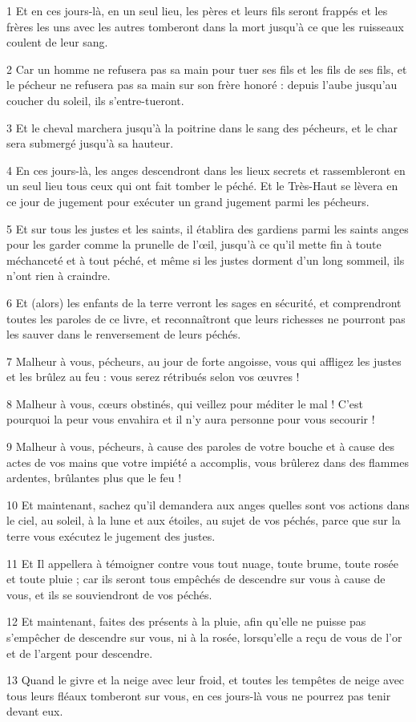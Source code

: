 \par 1 Et en ces jours-là, en un seul lieu, les pères et leurs fils seront frappés et les frères les uns avec les autres tomberont dans la mort jusqu'à ce que les ruisseaux coulent de leur sang.
\par 2 Car un homme ne refusera pas sa main pour tuer ses fils et les fils de ses fils, et le pécheur ne refusera pas sa main sur son frère honoré : depuis l'aube jusqu'au coucher du soleil, ils s'entre-tueront.
\par 3 Et le cheval marchera jusqu'à la poitrine dans le sang des pécheurs, et le char sera submergé jusqu'à sa hauteur.
\par 4 En ces jours-là, les anges descendront dans les lieux secrets et rassembleront en un seul lieu tous ceux qui ont fait tomber le péché. Et le Très-Haut se lèvera en ce jour de jugement pour exécuter un grand jugement parmi les pécheurs.
\par 5 Et sur tous les justes et les saints, il établira des gardiens parmi les saints anges pour les garder comme la prunelle de l'œil, jusqu'à ce qu'il mette fin à toute méchanceté et à tout péché, et même si les justes dorment d'un long sommeil, ils n'ont rien à craindre.
\par 6 Et (alors) les enfants de la terre verront les sages en sécurité, et comprendront toutes les paroles de ce livre, et reconnaîtront que leurs richesses ne pourront pas les sauver dans le renversement de leurs péchés.
\par 7 Malheur à vous, pécheurs, au jour de forte angoisse, vous qui affligez les justes et les brûlez au feu : vous serez rétribués selon vos œuvres !
\par 8 Malheur à vous, cœurs obstinés, qui veillez pour méditer le mal ! C'est pourquoi la peur vous envahira et il n'y aura personne pour vous secourir !
\par 9 Malheur à vous, pécheurs, à cause des paroles de votre bouche et à cause des actes de vos mains que votre impiété a accomplis, vous brûlerez dans des flammes ardentes, brûlantes plus que le feu !
\par 10 Et maintenant, sachez qu'il demandera aux anges quelles sont vos actions dans le ciel, au soleil, à la lune et aux étoiles, au sujet de vos péchés, parce que sur la terre vous exécutez le jugement des justes.
\par 11 Et Il appellera à témoigner contre vous tout nuage, toute brume, toute rosée et toute pluie ; car ils seront tous empêchés de descendre sur vous à cause de vous, et ils se souviendront de vos péchés.
\par 12 Et maintenant, faites des présents à la pluie, afin qu'elle ne puisse pas s'empêcher de descendre sur vous, ni à la rosée, lorsqu'elle a reçu de vous de l'or et de l'argent pour descendre.
\par 13 Quand le givre et la neige avec leur froid, et toutes les tempêtes de neige avec tous leurs fléaux tomberont sur vous, en ces jours-là vous ne pourrez pas tenir devant eux.

